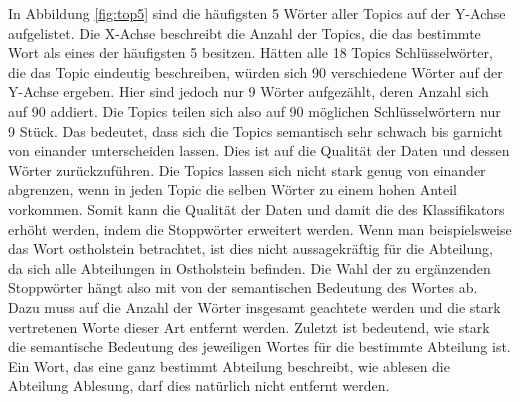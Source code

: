 \documentclass[german,version-2020-11]{uzl-thesis}
\begin{document}
In Abbildung \ref{fig:top5} sind die häufigsten 5 Wörter aller Topics auf der Y-Achse aufgelistet. Die X-Achse beschreibt die Anzahl der Topics, die das bestimmte Wort als eines der häufigsten 5 besitzen. Hätten alle 18 Topics Schlüsselwörter, die das Topic eindeutig beschreiben, würden sich 90 verschiedene Wörter auf der Y-Achse ergeben. Hier sind jedoch nur 9 Wörter aufgezählt, deren Anzahl sich auf 90 addiert. Die Topics teilen sich also auf 90 möglichen Schlüsselwörtern nur 9 Stück. Das bedeutet, dass sich die Topics semantisch sehr schwach bis garnicht von einander unterscheiden lassen. Dies ist auf die Qualität der Daten und dessen Wörter zurückzuführen. Die Topics lassen sich nicht stark genug von einander abgrenzen, wenn in jeden Topic die selben Wörter zu einem hohen Anteil vorkommen. Somit kann die Qualität der Daten und damit die des Klassifikators erhöht werden, indem die Stoppwörter erweitert werden. Wenn man beispielsweise das Wort ostholstein betrachtet, ist dies nicht aussagekräftig für die Abteilung, da sich alle Abteilungen in Ostholstein befinden. Die Wahl der zu ergänzenden Stoppwörter hängt also mit von der semantischen Bedeutung des Wortes ab. Dazu muss auf die Anzahl der Wörter insgesamt geachtete werden und die stark vertretenen Worte dieser Art entfernt werden. Zuletzt ist bedeutend, wie stark die semantische Bedeutung des jeweiligen Wortes für die bestimmte Abteilung ist. Ein Wort, das eine ganz bestimmt Abteilung beschreibt, wie ablesen die Abteilung Ablesung, darf dies natürlich nicht entfernt werden. 
\\

\end{document}
